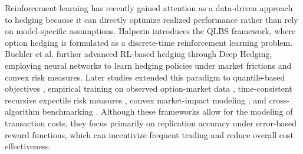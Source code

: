 Reinforcement learning has recently gained attention as a data-driven approach to hedging because it can directly optimize realized performance rather than rely on model-specific assumptions. Halperin \cite{halperin2020qlbs,halperin2019qlbs} introduces the QLBS framework, where option hedging is formulated as a discrete-time reinforcement learning problem. Buehler et al. \cite{buehler2019deep} further advanced RL-based hedging through Deep Hedging, employing neural networks to learn hedging policies under market frictions and convex risk measures. Later studies extended this paradigm to quantile-based objectives \cite{cao2023gamma}, empirical training on observed option-market data \cite{mikkila2023empirical}, time-consistent recursive expectile risk measures \cite{marzban2023deep}, convex market-impact modeling \cite{neagu2024deep}, and cross-algorithm benchmarking \cite{neagu2025deep,pickard2023deep}. Although these frameworks allow for the modeling of transaction costs, they focus primarily on replication accuracy under error-based reward functions, which can incentivize frequent trading and reduce overall cost effectiveness.

